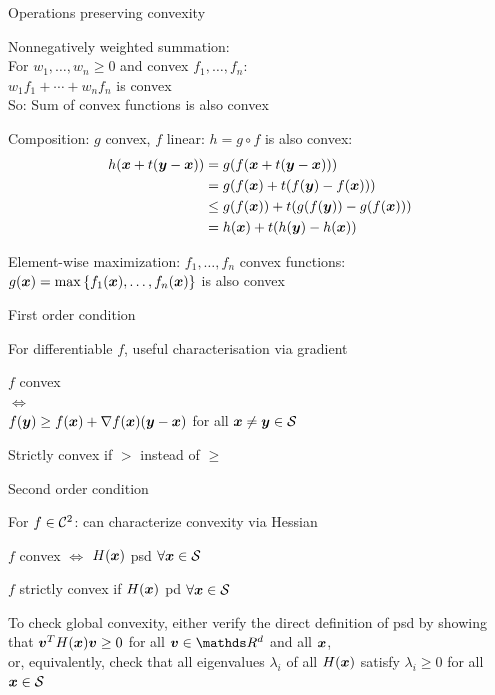\documentclass[11pt,compress,t,notes=noshow, xcolor=table]{beamer}
\begin{document}
\begin{framei}{Operations preserving convexity}  
\item Nonnegatively weighted summation:\\
For $w_1,\ldots,w_n\geq0$ and convex $f_1,\ldots,f_n$:\\
$w_1f_1 + \cdots + w_nf_n$ is convex \\
So: Sum of convex functions is also convex
\item Composition: $g$ convex, $f$ linear: $h = g \circ f$ is also convex:
\begin{align*}
h(\bm{x} + t(\bm{y}-\bm{x})) &= g(f(\bm{x} + t(\bm{y}-\bm{x}))) \\
&= g(f(\bm{x}) + t(f(\bm{y}) - f(\bm{x}))) \\
&\leq g(f(\bm{x})) + t(g(f(\bm{y})) - g(f(\bm{x}))) \\
&= h(\bm{x}) + t(h(\bm{y}) - h(\bm{x}))
\end{align*}
\item Element-wise maximization: $f_1,\ldots,f_n$ convex functions: $g(\bm{x}) = \max\left\lbrace f_1(\bm{x}),\ldots,f_n(\bm{x}) \right\rbrace$ is also convex
\end{framei}


\begin{framei}{First order condition}
\item For differentiable $f$, useful characterisation via gradient
\item $f$ convex \\
$\Longleftrightarrow$ \\
$f(\bm{y}) \geq f(\bm{x}) + \nabla f(\bm{x}) (\bm{y}-\bm{x})$ for all $\bm{x} \ne \bm{y} \in \mathcal{S}$
\item Strictly convex if $>$ instead of $\ge$
\end{framei}


\begin{framei}{Second order condition}
\item For $f \in \mathcal{C}^{2}$: can characterize convexity via Hessian
\item $f$ convex $\Longleftrightarrow$ $H(\bm{x})$ psd $\forall \bm{x} \in \mathcal{S}$
\item $f$ strictly convex if $H(\bm{x})$ pd $\forall \bm{x} \in \mathcal{S}$
\lz
\item To check global convexity, either verify the direct definition of psd by showing that $\bm{v}^T H(\bm{x}) \bm{v} \geq 0$ for all $\bm{v} \in \R^d$ and all $\bm{x}$,\\
or, equivalently, check that all eigenvalues $\lambda_i$ of all $H(\bm{x})$ satisfy $\lambda_i \geq 0$ for all $\bm{x} \in \mathcal{S}$
\end{framei}
\end{document}

